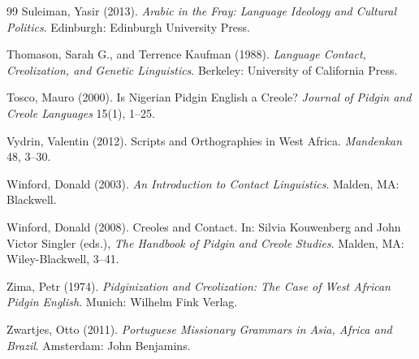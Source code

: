 \documentclass[12pt]{article}
\begin{document}
\begin{thebibliography}{99}
Suleiman, Yasir (2013).
\textit{Arabic in the Fray: Language Ideology and Cultural Politics}.
Edinburgh: Edinburgh University Press.

Thomason, Sarah G., and Terrence Kaufman (1988).
\textit{Language Contact, Creolization, and Genetic Linguistics}.
Berkeley: University of California Press.

Tosco, Mauro (2000).
Is Nigerian Pidgin English a Creole?
\textit{Journal of Pidgin and Creole Languages} 15(1), 1--25.

Vydrin, Valentin (2012).
Scripts and Orthographies in West Africa.
\textit{Mandenkan} 48, 3--30.

Winford, Donald (2003).
\textit{An Introduction to Contact Linguistics}.
Malden, MA: Blackwell.

Winford, Donald (2008).
Creoles and Contact.
In: Silvia Kouwenberg and John Victor Singler (eds.),
\textit{The Handbook of Pidgin and Creole Studies}.
Malden, MA: Wiley-Blackwell, 3--41.

Zima, Petr (1974).
\textit{Pidginization and Creolization: The Case of West African Pidgin English}.
Munich: Wilhelm Fink Verlag.

Zwartjes, Otto (2011).
\textit{Portuguese Missionary Grammars in Asia, Africa and Brazil}.
Amsterdam: John Benjamins.

\end{thebibliography}
\end{document}
